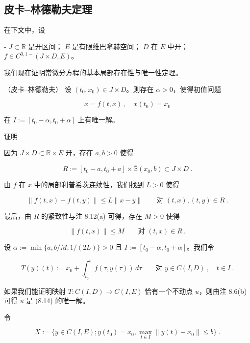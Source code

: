 \subsection*{皮卡–林德勒夫定理}

在下文中，设

- $ J\subset\mathbb{R} $ 是开区间；
  $ E $ 是有限维巴拿赫空间；
  $ D $ 在 $ E $ 中开；
  $ f\in C^{0,1-}(J\times D,E) $。

我们现在证明常微分方程的基本局部存在性与唯一性定理。

\begin{theorem}

（皮卡–林德勒夫） 设 $ (t_{0},x_{0})\in J\times D $。则存在 $ \alpha>0 $，使得初值问题

\begin{equation}
\dot{x}=f(t,x)\ ,\quad x(t_{0})=x_{0}\tag{8.14}
\end{equation}

在 $ I:=[t_{0}-\alpha,t_{0}+\alpha] $ 上有唯一解。

证明

\begin{subitems}
\item

因为 $ J\times D\subset\mathbb{R}\times E $ 开，存在 $ a,b>0 $ 使得

\[
R:=[t_{0}-a,t_{0}+a]\times\overline{\mathbb{B}}(x_{0},b)\subset J\times D \ .
\]

由 $ f $ 在 $ x $ 中的局部利普希茨连续性，我们找到 $ L>0 $ 使得

\[
\|f(t,x)-f(t,y)\|\le L\|x-y\|\qquad\text{对 }(t,x),(t,y)\in R \ .
\]

最后，由 $ R $ 的紧致性与注 8.12(a) 可得，存在 $ M>0 $ 使得

\[
\|f(t,x)\|\le M\qquad\text{对 }(t,x)\in R \ .
\]
\item

设 $ \alpha:=\min\{a,b/M,1/(2L)\}>0 $ 且 $ I:=[t_{0}-\alpha,t_{0}+\alpha] $。我们令

\[
T(y)(t):=x_{0}+\int_{t_{0}}^{t}f(\tau,y(\tau))\,d\tau\qquad\text{对 }y\in C(I,D)\ ,\quad t\in I \ .
\]

如果我们能证明映射 $ T:C(I,D)\to C(I,E) $ 恰有一个不动点 $ u $，则由注 8.6(b) 可得 $ u $ 是 (8.14) 的唯一解。

\item

令

\[
X:=\{y\in C(I,E);y(t_{0})=x_{0},\max_{t\in I}\|y(t)-x_{0}\|\le b\} \ .
\]


\end{subitems}
\end{theorem}

